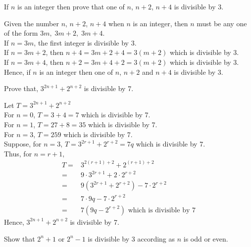 \documentclass[12pt]{book}
\begin{document}
\begin{qn}
    If $ n $ is an integer then prove that one of $ n $, $ n+2 $, $ n+4 $ is divisible by 3.
\end{qn}
\begin{soln}
    Given the number $ n $, $ n+2 $, $ n+4 $ when $ n  $ is an integer, then $ n $ must be any one of the form $ 3m,\;3m+2,\;3m+4 $.\\
    If $ n=3m $, the first integer is divisible by 3.\\
    If $ n=3m+2 $, then $ n+4=3m+2+4=3(m+2) $ which is divisible by 3.\\
    If $ n=3m+4 $, then $ n+2=3m+4+2=3(m+2) $ which is divisible by 3.\\
    Hence, if $ n $ is an integer then one of $ n $, $ n+2 $ and $ n+4 $ is divisible by 3.
\end{soln}
\begin{qn}
    Prove that, $ 3^{2n+1}+2^{n+2} $ is divisible by 7.
\end{qn}
\begin{soln}
    Let $ T=3^{2n+1}+2^{n+2} $\\
    For $ n=0 $, $ T=3+4=7 $ which is divisible by 7.\\
    For $ n=1 $, $ T=27+8=35 $ which is divisible by 7.\\
    For $ n=3 $, $ T=259 $ which is divisible by 7.\\
    Suppose, for $ n=3 $, $ T=3^{2r+1}+2^{r+2}=7q $ which is divisible by 7.\\
    Thus, for $ n=r+1 $,
    \begin{align*}
        T= & 3^{2(r+1)+2}+2^{(r+1)+2}                                \\
        =  & 9\cdot3^{2r+1}+2\cdot2^{r+2}                            \\
        =  & 9\left(3^{2r+1}+2^{r+2}\right)-7\cdot2^{r+2}            \\
        =  & 7\cdot 9q-7\cdot 2^{r+2}                                \\
        =  & 7\left(9q-2^{r+2}\right)\text{ which is divisible by }7
    \end{align*}
    Hence, $ 3^{2n+1}+2^{n+2} $ is divisible by 7.
\end{soln}
\begin{qn}
    Show that $ 2^n+1 $ or $ 2^n-1 $ is divisible by 3 according as $ n $ is odd or even.
\end{qn}
\end{document}
